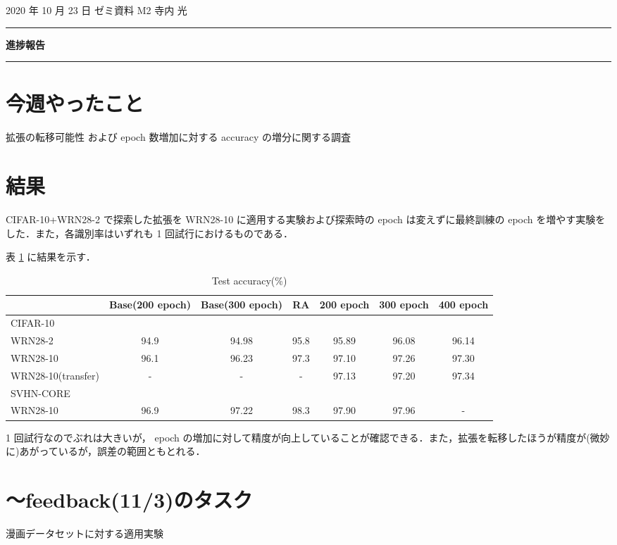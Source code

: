 \documentclass[onecolumn]{ujarticle}   %
\begin{document}
	\noindent

	\hspace{1em}
	2020 年 10 月 23 日
	ゼミ資料
	\hfill
	M2 寺内 光

	\vspace{2mm}

	\hrule

	\begin{center}
		{\Large \bf 進捗報告}
	\end{center}

	\hrule
	\vspace{3mm}

	\section{今週やったこと}
	拡張の転移可能性 および epoch 数増加に対する accuracy の増分に関する調査

  \section{結果}
  CIFAR-10+WRN28-2 で探索した拡張を WRN28-10 に適用する実験および探索時の epoch は変えずに最終訓練の epoch を増やす実験をした．また，各識別率はいずれも 1 回試行におけるものである．

  表 \ref{tab:compare_experiments} に結果を示す．
  \begin{table}[ht]
		\centering
		\caption{Test accuracy(\%)}
		\label{tab:compare_experiments}
		\begin{tabular}{l||c c c c c c} \hline
		  &Base(200 epoch)&Base(300 epoch)&RA&200 epoch&300 epoch&400 epoch\\ \hline
			CIFAR-10 &&&&&&\\
      WRN28-2&94.9&94.98&95.8&95.89&96.08&96.14\\
			WRN28-10&96.1&96.23&97.3&97.10&97.26&97.30\\
      WRN28-10(transfer)&-&-&-&97.13&97.20&97.34\\ \hline
      SVHN-CORE &&&&&&\\
      WRN28-10&96.9&97.22&98.3&97.90&97.96&- \\
		\end{tabular}
	\end{table}

  1 回試行なのでぶれは大きいが， epoch の増加に対して精度が向上していることが確認できる．また，拡張を転移したほうが精度が(微妙に)あがっているが，誤差の範囲ともとれる．


  \section{〜feedback(11/3)のタスク}
  漫画データセットに対する適用実験

\end{document}
